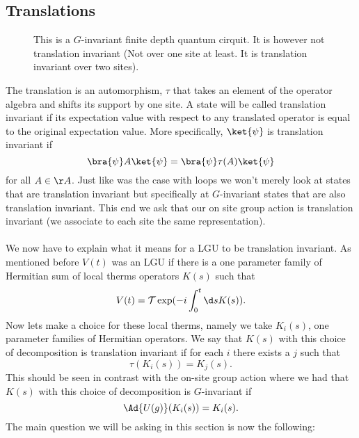 \subsection{Translations}
\begin{figure}
	\scalebox{0.7}{
	
	}
	\caption{This is a $G$-invariant finite depth quantum cirquit. It is however not translation invariant (Not over one site at least. It is translation invariant over two sites).}
	\label{fig:Z_2_and_TranslationInvariantStates}
\end{figure}
The translation is an automorphism, $\tau$ that takes an element of the operator algebra and shifts its support by one site. A state will be called translation invariant if its expectation value with respect to any translated operator is equal to the original expectation value. More specifically, $\ket{\psi}$ is translation invariant if
\begin{equation}
	\bra{\psi}A\ket{\psi}=\bra{\psi}\tau(A)\ket{\psi}
\end{equation}
for all $A\in\AA$. Just like was the case with loops we won't merely look at states that are translation invariant but specifically at $G$-invariant states that are also translation invariant. This end we ask that our on site group action is translation invariant (we associate to each site the same representation).\\\\
We now have to explain what it means for a LGU to be translation invariant. As mentioned before $V(t)$ was an LGU if there is a one parameter family of Hermitian sum of local therms operators $K(s)$ such that
\begin{equation}
	V(t)=\mathcal{T}\exp(-i\int_{0}^{t}\d s K(s)).
\end{equation}
Now lets make a choice for these local therms, namely we take $K_i(s)$, one parameter families of Hermitian operators. We say that $K(s)$ with this choice of decomposition is translation invariant if for each $i$ there exists a $j$ such that
\begin{equation}
	\tau(K_i(s))=K_j(s).
\end{equation}
This should be seen in contrast with the on-site group action where we had that $K(s)$ with this choice of decomposition is $G$-invariant if
\begin{equation}
	\Ad{U(g)}(K_i(s))=K_i(s).
\end{equation}
The main question we will be asking in this section is now the following:
